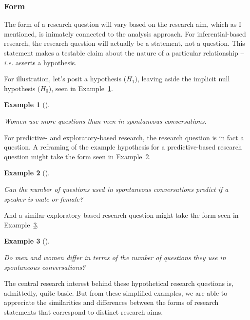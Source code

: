 \documentclass[
  letterpaper,
  krantz1]{latex/krantz-mod}
\theoremstyle{definition}
\newtheorem{example}{Example}[chapter]
\theoremstyle{definition}
\theoremstyle{remark}
\begin{document}
\subsubsection{Form}\label{sec-research-question-form}

The form of a research question will vary based on the research aim,
which as I mentioned, is inimately connected to the analysis approach.
For inferential-based research, the research question will actually be a
statement, not a question. This statement makes a testable claim about
the nature of a particular relationship --\emph{i.e.} asserts a
hypothesis.

For illustration, let's posit a hypothesis (\(H_1\)), leaving aside the
implicit null hypothesis (\(H_0\)), seen in
Example~\ref{exm-research-form-infer}.

\begin{example}[]\protect\hypertarget{exm-research-form-infer}{}\label{exm-research-form-infer}

\emph{Women use more questions than men in spontaneous conversations.}

\end{example}

For predictive- and exploratory-based research, the research question is
in fact a question. A reframing of the example hypothesis for a
predictive-based research question might take the form seen in
Example~\ref{exm-research-form-pred}.

\begin{example}[]\protect\hypertarget{exm-research-form-pred}{}\label{exm-research-form-pred}

\emph{Can the number of questions used in spontaneous conversations
predict if a speaker is male or female?}

\end{example}

And a similar exploratory-based research question might take the form
seen in Example~\ref{exm-research-form-exp}.

\begin{example}[]\protect\hypertarget{exm-research-form-exp}{}\label{exm-research-form-exp}

\emph{Do men and women differ in terms of the number of questions they
use in spontaneous conversations?}

\end{example}

The central research interest behind these hypothetical research
questions is, admittedly, quite basic. But from these simplified
examples, we are able to appreciate the similarities and differences
between the forms of research statements that correspond to distinct
research aims.
\end{document}
